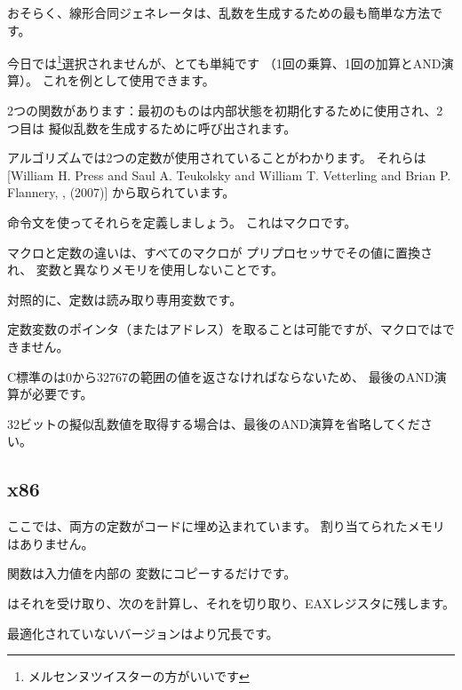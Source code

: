 ﻿
\label{LCG_simple}

おそらく、線形合同ジェネレータは、乱数を生成するための最も簡単な方法です。

今日では\footnote{メルセンヌツイスターの方がいいです}選択されませんが、とても単純です
（1回の乗算、1回の加算とAND演算）。
これを例として使用できます。



2つの関数があります：最初のものは内部状態を初期化するために使用され、2つ目は
擬似乱数を生成するために呼び出されます。

アルゴリズムでは2つの定数が使用されていることがわかります。 
それらは[William H. Press and Saul A. Teukolsky and William T. Vetterling and Brian P. Flannery, , (2007)]
から取られています。

 \CCpp 命令文を使ってそれらを定義しましょう。 これはマクロです。

\CCpp マクロと定数の違いは、すべてのマクロが \CCpp プリプロセッサでその値に置換され、
変数と異なりメモリを使用しないことです。

対照的に、定数は読み取り専用変数です。

定数変数のポインタ（またはアドレス）を取ることは可能ですが、マクロではできません。

C標準のは0から32767の範囲の値を返さなければならないため、
最後のAND演算が必要です。

32ビットの擬似乱数値を取得する場合は、最後のAND演算を省略してください。

\subsection{x86}



ここでは、両方の定数がコードに埋め込まれています。 
割り当てられたメモリはありません。

関数は入力値を内部の
変数にコピーするだけです。

はそれを受け取り、次のを計算し、それを切り取り、EAXレジスタに残します。

最適化されていないバージョンはより冗長です。



